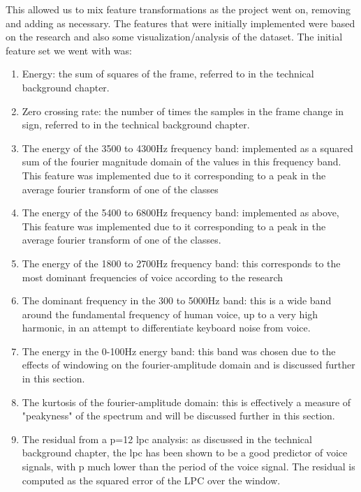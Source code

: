 \documentclass[ %
                    author={Sam Phippen},
                supervisor={Dr. Rafal Bogacz},
                     title={Real time voice activity detectors in noisy personal computing environments},
                  subtitle={},
                    degree={MEng},
                      year={2012} ]{thesis}
\begin{document}
This allowed us to mix feature transformations as the project went on, removing
and adding as necessary. The features that were initially implemented were
based on the research and also some visualization/analysis of the dataset. The
initial feature set we went with was:

\begin{enumerate}
    \item Energy: the sum of squares of the frame, referred to in the technical
        background chapter.

    \item Zero crossing rate: the number of times the samples in the frame
        change in sign, referred to in the technical background chapter.

    \item The energy of the 3500 to 4300Hz frequency band: implemented as a
        squared sum of the fourier magnitude domain of the values in this
        frequency band. This feature was implemented due to it corresponding to
        a peak in the average fourier transform of one of the classes

    \item The energy of the 5400 to 6800Hz frequency band: implemented as above,
        This feature was implemented due to it corresponding to a peak in the
        average fourier transform of one of the classes.

    \item The energy of the 1800 to 2700Hz frequency band: this corresponds to
        the most dominant frequencies of voice according to the research

    \item The dominant frequency in the 300 to 5000Hz band: this is a wide band
        around the fundamental frequency of human voice, up to a very high harmonic,
        in an attempt to differentiate keyboard noise from voice.

    \item The energy in the 0-100Hz energy band: this band was chosen
        due to the effects of windowing on the fourier-amplitude domain and is discussed
        further in this section.

    \item The kurtosis of the fourier-amplitude domain: this is effectively a
        measure of "peakyness" of the spectrum and will be discussed further
        in this section.


    \item The residual from a p=12 lpc analysis: as discussed in the technical
        background chapter, the lpc has been shown to be a good predictor of
        voice signals, with p much lower than the period of the voice signal.
        The residual is computed as the squared error of the LPC over the window.


\end{enumerate}
\end{document}
